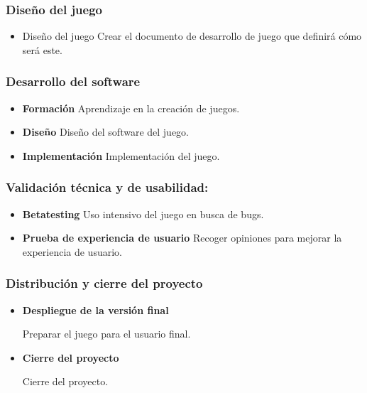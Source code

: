 			\subsubsection{Diseño del juego}

			\begin{itemize}
				\item Diseño del juego
				Crear el documento de desarrollo de juego que definirá cómo será este.
			\end{itemize}

			\subsubsection{Desarrollo del software}

			\begin{itemize}
				\item \textbf{Formación}
				Aprendizaje en la creación de juegos.
				\item \textbf{Diseño}
				Diseño del software del juego.
				\item \textbf{Implementación}
				Implementación del juego.
			\end{itemize}

			\subsubsection{Validación técnica y de usabilidad:}

			\begin{itemize}
				\item \textbf{Betatesting}
				Uso intensivo del juego en busca de bugs.
				\item \textbf{Prueba de experiencia de usuario}
				Recoger opiniones para mejorar la experiencia de usuario.
			\end{itemize}

			\subsubsection{Distribución y cierre del proyecto}

			\begin{itemize}
				\item \textbf{Despliegue de la versión final}
				
				Preparar el juego para el usuario final.
				\item \textbf{Cierre del proyecto}

				Cierre del proyecto.
			\end{itemize}

